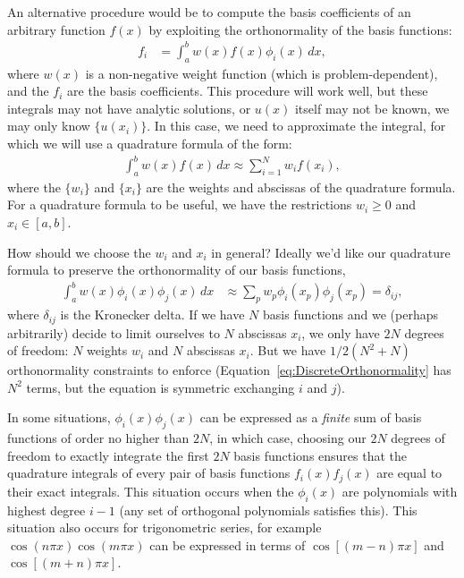 \documentclass[aip,amsmath,amssymb,reprint,twocolumn]{revtex4-1}
\begin{document}
An alternative procedure would be to compute the basis coefficients of an arbitrary function $f(x)$ by exploiting the orthonormality of the basis functions:
\begin{align}
  f_i &= \int_a^b w(x) f(x) \phi_i(x)\, dx,
\end{align}
where $w(x)$ is a non-negative weight function (which is problem-dependent), and the $f_i$ are the basis coefficients.  This procedure will work well, but these integrals may not have analytic solutions, or $u(x)$ itself may not be known, we may only know $\{u(x_i)\}$.  In this case, we need to approximate the integral, for which we will use a quadrature formula of the form:
\begin{align}
  \int_a^b w(x) f(x) \, dx \approx \sum_{i=1}^N w_i f(x_i),
\end{align}
where the $\{w_i\}$ and $\{x_i\}$ are the weights and abscissas of the quadrature formula.  For a quadrature formula to be useful, we have the restrictions $w_i \ge 0$ and $x_i \in [a, b]$.

How should we choose the $w_i$ and $x_i$ in general?  Ideally we'd like our quadrature formula to preserve the orthonormality of our basis functions,
\begin{align}
  \int_a^b w(x) \phi_i(x) \phi_j(x)\, dx &\approx \sum_p w_p \phi_i(x_p) \phi_j(x_p) = \delta_{ij}, \label{eq:DiscreteOrthonormality}
\end{align}
where $\delta_{ij}$ is the Kronecker delta.  If we have $N$ basis functions and we (perhaps arbitrarily) decide to limit ourselves to $N$ abscissas $x_i$, we only have $2N$ degrees of freedom: $N$ weights $w_i$ and $N$ abscissas $x_i$.  But we have $1/2 (N^2 + N)$ orthonormality constraints to enforce (Equation~\eqref{eq:DiscreteOrthonormality} has $N^2$ terms, but the equation is symmetric exchanging $i$ and $j$).

In some situations, $\phi_i(x) \phi_j(x)$ can be expressed as a \emph{finite} sum of basis functions of order no higher than $2N$, in which case, choosing our $2N$ degrees of freedom to exactly integrate the first $2N$ basis functions ensures that the quadrature integrals of every pair of basis functions $f_i(x) f_j(x)$ are equal to their exact integrals.  This situation occurs when the $\phi_i(x)$ are polynomials with highest degree $i-1$ (any set of orthogonal polynomials satisfies this).  This situation also occurs for trigonometric series, for example $\cos(n \pi x) \cos(m \pi x)$ can be expressed in terms of $\cos[(m-n)\pi x]$ and $\cos[(m+n)\pi x]$.
\end{document}
